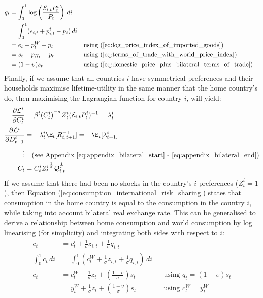 \begin{align}
    q_t               & = \int_{0}^{1} \log \left( \frac{\mathcal{E}_{i,t}P_{t}^i}{P_t} \right) \, di                                                                           \\
    & = \int_{0}^{1} (e_{i,t} + p_{i,t}^i - p_t) \, di                              &  &                                                                      \\
    & = e_t + p_t^{W} - p_t                                                     &  & \text{using (\ref{eq:log_price_index_of_imported_goods})}            \\
    & = s_t + p_{H_t} - p_t                                                         &  & \text{using (\ref{eq:terms_of_trade_with_world_price_index})}        \\
    & = (1-\upsilon)s_t                                                               &  & \text{using (\ref{eq:domestic_price_plus_bilateral_terms_of_trade})}
\end{align}
Finally, if we assume that all countries $i$ have symmetrical preferences and their households maximise lifetime-utility in the same manner that the home country's do, then maximising the Lagrangian function for country $i$, will yield:
\begin{align}
    \frac{\partial \mathcal{L}^i}{\partial C_t^i} &= \beta^t {(C^i_t)}^{-\sigma} Z^i_t(\mathcal{E}_{i,t}P^i_{t})^{-1} = \lambda^i_t \nonumber\\
    \frac{\partial \mathcal{L}^i}{\partial D_{t+1}^i} & = -\lambda^i_t \E_t[R^{-1}_{t,t+1}] = -\E_t[\lambda^i_{t+1}] \nonumber\\
    \vdots & \quad \text{(see Appendix \ref{eq:appendix_bilateral_start} - \ref{eq:appendix_bilateral_end})} \\
    C_t  &= {C^i_t} {Z^i_t}^{\frac{1}{\sigma}} \mathcal{Q}_{i,t}^{\frac{1}{\sigma}} \label{eq:consumption_international_risk_sharing}
\end{align}
If we assume that there had been no shocks in the country's $i$ preferences ($Z^i_t = 1$), then Equation (\ref{eq:consumption_international_risk_sharing}) states that consumption in the home country is equal to the consumption in the country $i$, while taking into account bilateral real exchange rate. This can be generalised to derive a relationship between home consumption and world consumption by log linearising (for simplicity) and integrating both sides with respect to $i$:
\begin{align}
    c_t &= c_{t}^i + \frac{1}{\sigma}z_{i,t} + \frac{1}{\sigma}q_{i,t} \\
    \int_{0}^{1} c_t \, di & = \int_{0}^{1} \left( c_t^{W} + \frac{1}{\sigma}z_{i,t} + \frac{1}{\sigma} q_{i,t}\right) \, di \\
    c_t & = c_t^{W} + \frac{1}{\sigma}z_t + \left(\frac{1-\upsilon}{\sigma}\right)s_t \label{eq:link_between_consumption_and_world_consumption} &  & \text{using $q_t=(1-\upsilon)s_t$} \\
    & = y_t^{W} + \frac{1}{\sigma}z_t + \left(\frac{1-\upsilon}{\sigma}\right)s_t \label{eq:link_between_consumption_and_world_output} &  & \text{using $c^{W}_t=y^{W}_t$} 
\end{align}
